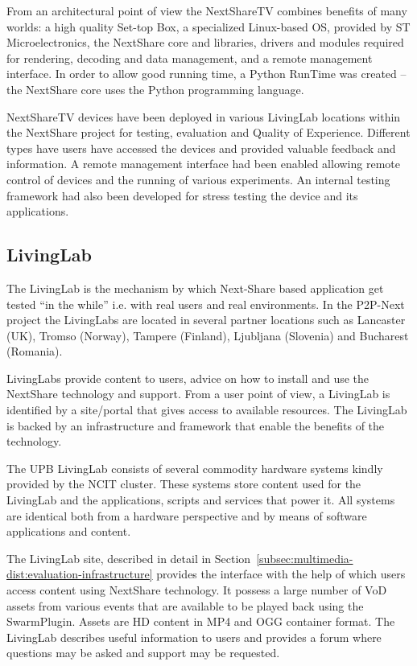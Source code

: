 From an architectural point of view the NextShareTV combines benefits of many
worlds: a high quality Set-top Box, a specialized Linux-based OS, provided by
ST Microelectronics, the NextShare core and libraries, drivers and modules
required for rendering, decoding and data management, and a remote management
interface. In order to allow good running time, a Python RunTime was created
-- the NextShare core uses the Python programming language.

NextShareTV devices have been deployed in various LivingLab locations within
the NextShare project for testing, evaluation and Quality of Experience.
Different types have users have accessed the devices and provided valuable
feedback and information. A remote management interface had been enabled
allowing remote control of devices and the running of various experiments. An
internal testing framework had also been developed for stress testing the
device and its applications.

\subsection{LivingLab}
\label{subsec:multimedia-dist:nextshare-ll}

The LivingLab is the mechanism by which Next-Share based application get
tested ``in the while'' i.e. with real users and real environments. In the
P2P-Next project the LivingLabs are located in several partner locations such
as Lancaster (UK), Tromso (Norway), Tampere (Finland), Ljubljana (Slovenia)
and Bucharest (Romania).

LivingLabs provide content to users, advice on how to install and use the
NextShare technology and support. From a user point of view, a LivingLab is
identified by a site/portal that gives access to available resources. The
LivingLab is backed by an infrastructure and framework that enable the
benefits of the technology.

The UPB LivingLab consists of several commodity hardware systems kindly
provided by the NCIT cluster. These systems store content used for the
LivingLab and the applications, scripts and services that power it. All
systems are identical both from a hardware perspective and by means of
software applications and content.

The LivingLab site, described in detail in
Section~\ref{subsec:multimedia-dist:evaluation-infrastructure} provides the
interface with the help of which users access content using NextShare
technology. It possess a large number of VoD assets from various events that
are available to be played back using the SwarmPlugin. Assets are HD content
in MP4 and OGG container format. The LivingLab describes useful information to
users and provides a forum where questions may be asked and support may be
requested.

